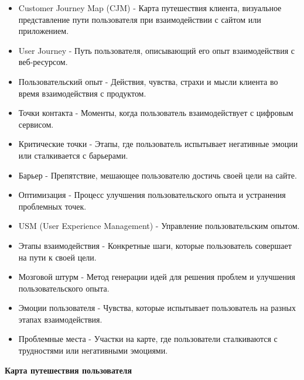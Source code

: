 \begin{itemize}
    \item Customer Journey Map (CJM) - Карта путешествия клиента, визуальное представление пути пользователя при взаимодействии с сайтом или приложением.
    \item User Journey - Путь пользователя, описывающий его опыт взаимодействия с веб-ресурсом.
    \item Пользовательский опыт - Действия, чувства, страхи и мысли клиента во время взаимодействия с продуктом.
    \item Точки контакта - Моменты, когда пользователь взаимодействует с цифровым сервисом.
    \item Критические точки - Этапы, где пользователь испытывает негативные эмоции или сталкивается с барьерами.
    \item Барьер - Препятствие, мешающее пользователю достичь своей цели на сайте.
    \item Оптимизация - Процесс улучшения пользовательского опыта и устранения проблемных точек.
    \item USM (User Experience Management) - Управление пользовательским опытом.
    \item Этапы взаимодействия - Конкретные шаги, которые пользователь совершает на пути к своей цели.
    \item Мозговой штурм - Метод генерации идей для решения проблем и улучшения пользовательского опыта.
    \item Эмоции пользователя - Чувства, которые испытывает пользователь на разных этапах взаимодействия.
    \item Проблемные места - Участки на карте, где пользователи сталкиваются с трудностями или негативными эмоциями.
\end{itemize}
\bigskip

\textbf{Карта путешествия пользователя}

\noindent
\begin{minipage}{\linewidth}
\end{minipage}
\bigskip

